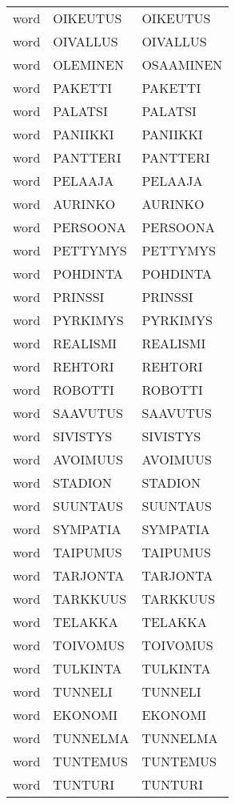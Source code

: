 \begin{supertabular}{lll}
 word &  OIKEUTUS &       OIKEUTUS \\
 word &  OIVALLUS &       OIVALLUS \\
 word &  OLEMINEN &      OSAAMINEN \\
 word &   PAKETTI &        PAKETTI \\
 word &   PALATSI &        PALATSI \\
 word &  PANIIKKI &       PANIIKKI \\
 word &  PANTTERI &       PANTTERI \\
 word &   PELAAJA &        PELAAJA \\
 word &   AURINKO &        AURINKO \\
 word &  PERSOONA &       PERSOONA \\
 word &  PETTYMYS &       PETTYMYS \\
 word &  POHDINTA &       POHDINTA \\
 word &   PRINSSI &        PRINSSI \\
 word &  PYRKIMYS &       PYRKIMYS \\
 word &  REALISMI &       REALISMI \\
 word &   REHTORI &        REHTORI \\
 word &   ROBOTTI &        ROBOTTI \\
 word &  SAAVUTUS &       SAAVUTUS \\
 word &  SIVISTYS &       SIVISTYS \\
 word &  AVOIMUUS &       AVOIMUUS \\
 word &   STADION &        STADION \\
 word &  SUUNTAUS &       SUUNTAUS \\
 word &  SYMPATIA &       SYMPATIA \\
 word &  TAIPUMUS &       TAIPUMUS \\
 word &  TARJONTA &       TARJONTA \\
 word &  TARKKUUS &       TARKKUUS \\
 word &   TELAKKA &        TELAKKA \\
 word &  TOIVOMUS &       TOIVOMUS \\
 word &  TULKINTA &       TULKINTA \\
 word &   TUNNELI &        TUNNELI \\
 word &   EKONOMI &        EKONOMI \\
 word &  TUNNELMA &       TUNNELMA \\
 word &  TUNTEMUS &       TUNTEMUS \\
 word &   TUNTURI &        TUNTURI \\

\end{supertabular}
